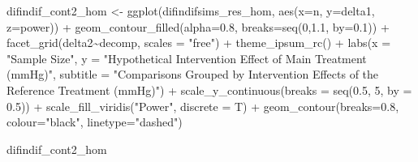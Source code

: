 \documentclass[
]{article}
\newenvironment{Shaded}{\begin{snugshade}}{\end{snugshade}}
\newcommand{\AttributeTok}[1]{\textcolor[rgb]{0.77,0.63,0.00}{#1}}
\newcommand{\DecValTok}[1]{\textcolor[rgb]{0.00,0.00,0.81}{#1}}
\newcommand{\FloatTok}[1]{\textcolor[rgb]{0.00,0.00,0.81}{#1}}
\newcommand{\FunctionTok}[1]{\textcolor[rgb]{0.00,0.00,0.00}{#1}}
\newcommand{\NormalTok}[1]{#1}
\newcommand{\OtherTok}[1]{\textcolor[rgb]{0.56,0.35,0.01}{#1}}
\newcommand{\SpecialCharTok}[1]{\textcolor[rgb]{0.00,0.00,0.00}{#1}}
\newcommand{\StringTok}[1]{\textcolor[rgb]{0.31,0.60,0.02}{#1}}
\begin{document}
\begin{Shaded}
\begin{Highlighting}[]
\NormalTok{difindif\_cont2\_hom }\OtherTok{\textless{}{-}} \FunctionTok{ggplot}\NormalTok{(difindifsims\_res\_hom, }\FunctionTok{aes}\NormalTok{(}\AttributeTok{x=}\NormalTok{n, }\AttributeTok{y=}\NormalTok{delta1, }\AttributeTok{z=}\NormalTok{power)) }\SpecialCharTok{+}
  \FunctionTok{geom\_contour\_filled}\NormalTok{(}\AttributeTok{alpha=}\FloatTok{0.8}\NormalTok{, }\AttributeTok{breaks=}\FunctionTok{seq}\NormalTok{(}\DecValTok{0}\NormalTok{,}\FloatTok{1.1}\NormalTok{, }\AttributeTok{by=}\FloatTok{0.1}\NormalTok{)) }\SpecialCharTok{+}
  \FunctionTok{facet\_grid}\NormalTok{(delta2}\SpecialCharTok{\textasciitilde{}}\NormalTok{decomp, }\AttributeTok{scales =} \StringTok{"free"}\NormalTok{) }\SpecialCharTok{+}
  \FunctionTok{theme\_ipsum\_rc}\NormalTok{() }\SpecialCharTok{+}
  \FunctionTok{labs}\NormalTok{(}\AttributeTok{x =} \StringTok{"Sample Size"}\NormalTok{,}
       \AttributeTok{y =} \StringTok{"Hypothetical Intervention Effect of Main Treatment (mmHg)"}\NormalTok{,}
       \AttributeTok{subtitle =} \StringTok{"Comparisons Grouped by Intervention Effects of the Reference Treatment (mmHg)"}\NormalTok{) }\SpecialCharTok{+}
  \FunctionTok{scale\_y\_continuous}\NormalTok{(}\AttributeTok{breaks =} \FunctionTok{seq}\NormalTok{(}\FloatTok{0.5}\NormalTok{, }\DecValTok{5}\NormalTok{, }\AttributeTok{by =} \FloatTok{0.5}\NormalTok{)) }\SpecialCharTok{+}
  \FunctionTok{scale\_fill\_viridis}\NormalTok{(}\StringTok{"Power"}\NormalTok{, }\AttributeTok{discrete =}\NormalTok{ T) }\SpecialCharTok{+}
  \FunctionTok{geom\_contour}\NormalTok{(}\AttributeTok{breaks=}\FloatTok{0.8}\NormalTok{, }\AttributeTok{colour=}\StringTok{"black"}\NormalTok{, }\AttributeTok{linetype=}\StringTok{"dashed"}\NormalTok{)}

\NormalTok{difindif\_cont2\_hom}
\end{Highlighting}
\end{Shaded}
\end{document}
